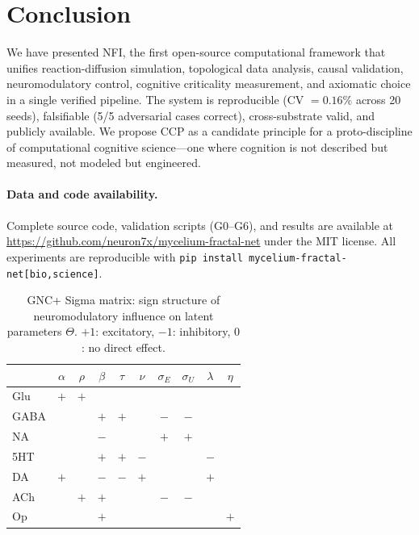 \documentclass[10pt,letterpaper]{article}
\begin{document}
\section{Conclusion}

We have presented NFI, the first open-source computational framework
that unifies reaction-diffusion simulation, topological data analysis,
causal validation, neuromodulatory control, cognitive criticality
measurement, and axiomatic choice in a single verified pipeline.
The system is reproducible (CV $= 0.16\%$ across 20 seeds),
falsifiable (5/5 adversarial cases correct), cross-substrate valid,
and publicly available. We propose CCP as a candidate principle for
a proto-discipline of computational cognitive science---one where
cognition is not described but measured, not modeled but engineered.

\paragraph{Data and code availability.}
Complete source code, validation scripts (G0--G6), and results are
available at \url{https://github.com/neuron7x/mycelium-fractal-net}
under the MIT license. All experiments are reproducible with
\texttt{pip install mycelium-fractal-net[bio,science]}.


\begin{table}[!ht]
\centering
\caption{GNC+ Sigma matrix: sign structure of neuromodulatory
influence on latent parameters $\Theta$. $+1$: excitatory,
$-1$: inhibitory, $0$: no direct effect.}
\label{tab:sigma}
\small
\begin{tabular}{l*{9}{c}}
\toprule
& $\alpha$ & $\rho$ & $\beta$ & $\tau$ & $\nu$
& $\sigma_E$ & $\sigma_U$ & $\lambda$ & $\eta$ \\
\midrule
Glu  & $+$ & $+$ &     &     &     &     &     &     &     \\
GABA &     &     & $+$ & $+$ &     & $-$ & $-$ &     &     \\
NA   &     &     & $-$ &     &     & $+$ & $+$ &     &     \\
5HT  &     &     & $+$ & $+$ & $-$ &     &     & $-$ &     \\
DA   & $+$ &     & $-$ & $-$ & $+$ &     &     & $+$ &     \\
ACh  &     & $+$ & $+$ &     &     & $-$ & $-$ &     &     \\
Op   &     &     & $+$ &     &     &     &     &     & $+$ \\
\bottomrule
\end{tabular}
\end{table}
\end{document}
